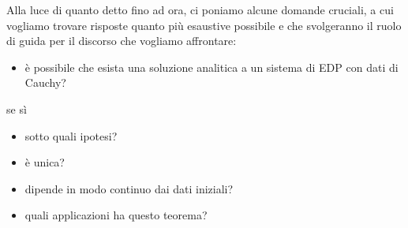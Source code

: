 Alla luce di quanto detto fino ad ora, ci poniamo alcune domande cruciali, a cui vogliamo trovare risposte quanto più esaustive possibile e che svolgeranno il ruolo di guida per il discorso che vogliamo affrontare:
\begin{itemize}
\item è possibile che esista una soluzione analitica a un sistema di EDP con dati di Cauchy?
\end{itemize}
se sì
\begin{itemize}
\item sotto quali ipotesi?
\item è unica?
\item dipende in modo continuo dai dati iniziali?
\item quali applicazioni ha questo teorema?
\end{itemize}




